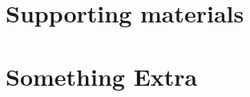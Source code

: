 \chapter{Supporting materials}
\label{sec:supportingMaterial}
\cleardoublepage


\chapter{Something Extra}
\label{sec:somethingExtra}
\cleardoublepage
